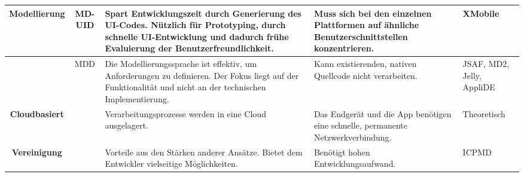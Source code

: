 \begin{table}[htbp]
{\begin{tabular}{|c|c|p{8cm}|p{6cm}|p{}|}
			\textbf{Modellierung}                  & MD-UID                                      & Spart Entwicklungszeit durch Generierung des UI-Codes. Nützlich für Prototyping, durch schnelle UI-Entwicklung und dadurch frühe Evaluierung der Benutzerfreundlichkeit.                                                                                                                                                         & Muss sich bei den einzelnen Plattformen auf ähnliche Benutzerschnittstellen konzentrieren.                                                                                                             &  XMobile                                                                                                                                            \\ \hline
			\textbf{}                              & MDD                                         & Die Modellierungssprache ist effektiv, um Anforderungen zu definieren. Der Fokus liegt auf der Funktionalität und nicht an der technischen Implementierung.                                                                                                                                                                      & Kann existierenden, nativen Quellcode nicht verarbeiten.                                                                                                                                               & JSAF, MD2, Jelly, AppliDE                                                                             \\ \hline
			\textbf{Cloudbasiert}                 &                                             & Verarbeitungsprozesse werden in eine Cloud ausgelagert.                                                                                                                                                                                                                                                                          & Das Endgerät und die App benötigen eine schnelle, permanente Netzwerkverbindung.                                                                                                                       &  Theoretisch                                                                                                                                         \\ \hline
			\textbf{Vereinigung}                   &                                             & Vorteile aus den Stärken anderer Ansätze. Bietet dem Entwickler vielseitige Möglichkeiten.                                                                                                                                                                                                                                       & Benötigt hohen Entwicklungsaufwand.                                                                                                                                                                    &  ICPMD                                                                                                                                             \\ \hline

\end{tabular}}
\end{table}
